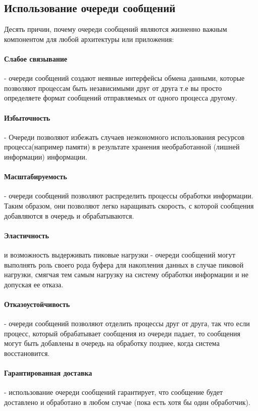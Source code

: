 \subsection{Использование очереди сообщений}

Десять причин, почему очереди сообщений являются жизненно важным компонентом для любой архитектуры или приложения:
\paragraph{Слабое связывание} - очереди сообщений создают неявные интерфейсы обмена данными, которые позволяют процессам быть независимыми друг от друга т.е вы просто определяете формат сообщений отправляемых от одного процесса другому.
\paragraph{Избыточность} - Очереди позволяют избежать случаев неэкономного использования ресурсов процесса(например памяти) в результате хранения необработанной (лишней информации) информации.
\paragraph{Масштабируемость} - очереди сообщений позволяют распределить процессы обработки информации. Таким образом, они позволяют легко наращивать скорость, с которой сообщения добавляются в очередь и обрабатываются.
\paragraph{Эластичность} и возможность выдерживать пиковые нагрузки - очереди сообщений могут выполнять роль своего рода буфера для накопления данных в случае пиковой нагрузки, смягчая тем самым нагрузку на систему обработки информации и не допуская ее отказа.
\paragraph{Отказоустойчивость} - очереди сообщений позволяют отделить процессы друг от друга, так что если процесс, который обрабатывает сообщения из очереди падает, то сообщения могут быть добавлены в очередь на обработку позднее, когда система восстановится.
\paragraph{Гарантированная доставка} - использование очереди сообщений гарантирует, что сообщение будет доставлено и обработано в любом случае (пока есть хотя бы один обработчик).
